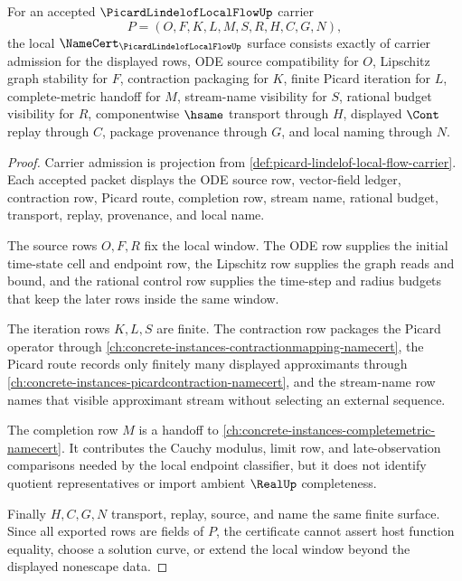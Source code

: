 \begin{theorem}
\label{thm:picard-lindelof-local-flow-namecert-obligations}
For an accepted $\PicardLindelofLocalFlowUp$ carrier
$$
P=(O,F,K,L,M,S,R,H,C,G,N),
$$
the local $\NameCert_{\PicardLindelofLocalFlowUp}$ surface consists exactly of carrier admission for the displayed rows, ODE source compatibility for $O$, Lipschitz graph stability for $F$, contraction packaging for $K$, finite Picard iteration for $L$, complete-metric handoff for $M$, stream-name visibility for $S$, rational budget visibility for $R$, componentwise $\hsame$ transport through $H$, displayed $\Cont$ replay through $C$, package provenance through $G$, and local naming through $N$.
\end{theorem}
\begin{proof}
Carrier admission is projection from \autoref{def:picard-lindelof-local-flow-carrier}. Each accepted packet displays the ODE source row, vector-field ledger, contraction row, Picard route, completion row, stream name, rational budget, transport, replay, provenance, and local name.

The source rows $O,F,R$ fix the local window. The ODE row supplies the initial time-state cell and endpoint row, the Lipschitz row supplies the graph reads and bound, and the rational control row supplies the time-step and radius budgets that keep the later rows inside the same window.

The iteration rows $K,L,S$ are finite. The contraction row packages the Picard operator through \autoref{ch:concrete-instances-contractionmapping-namecert}, the Picard route records only finitely many displayed approximants through \autoref{ch:concrete-instances-picardcontraction-namecert}, and the stream-name row names that visible approximant stream without selecting an external sequence.

The completion row $M$ is a handoff to \autoref{ch:concrete-instances-completemetric-namecert}. It contributes the Cauchy modulus, limit row, and late-observation comparisons needed by the local endpoint classifier, but it does not identify quotient representatives or import ambient $\RealUp$ completeness.

Finally $H,C,G,N$ transport, replay, source, and name the same finite surface. Since all exported rows are fields of $P$, the certificate cannot assert host function equality, choose a solution curve, or extend the local window beyond the displayed nonescape data.
\end{proof}


